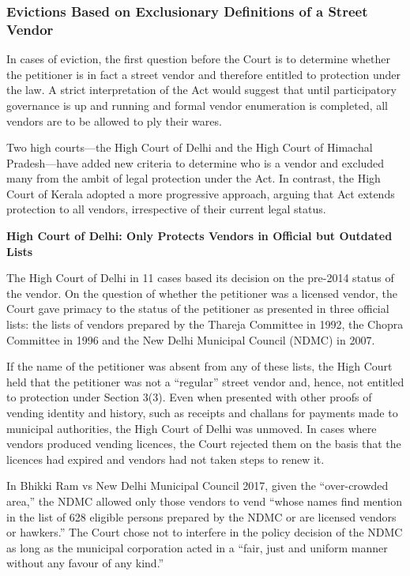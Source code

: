 \documentclass[a4paper, 12pt, twoside]{article}
\begin{document}
{\subsubsection*{Evictions Based on Exclusionary Definitions of a Street Vendor}

In cases of eviction, the first question before the Court is to determine whether the petitioner is in fact a street vendor and therefore entitled to protection under the law. A strict interpretation of the Act would suggest that until participatory governance is up and running and formal vendor enumeration is completed, all vendors are to be allowed to ply their wares.

Two high courts—the High Court of Delhi and the High Court of Himachal Pradesh—have added new criteria to determine who is a vendor and excluded many from the ambit of legal protection under the Act. In contrast, the High Court of Kerala adopted a more progressive approach, arguing that Act extends protection to all vendors, irrespective of their current legal status.

\textbf{High Court of Delhi: Only Protects Vendors in Official but Outdated Lists}

The High Court of Delhi in 11 cases  based its decision on the pre-2014 status of the vendor. On the question of whether the petitioner was a licensed vendor, the Court gave primacy to the status of the petitioner as presented in three official lists: the lists of vendors prepared by the Thareja Committee in 1992, the Chopra Committee in 1996 and the New Delhi Municipal Council (NDMC) in 2007.

If the name of the petitioner was absent from any of these lists, the High Court held that the petitioner was not a “regular” street vendor and, hence, not entitled to protection under Section 3(3). Even when presented with other proofs of vending identity and history, such as receipts  and challans for payments made to municipal authorities, the High Court of Delhi was unmoved. In cases where vendors produced vending licences, the Court rejected them on the basis that the licences had expired and vendors had not taken steps to renew it.

In Bhikki Ram vs New Delhi Municipal Council 2017, given the “over-crowded area,” the NDMC allowed only those vendors to vend “whose names find mention in the list of 628 eligible persons prepared by the NDMC or are licensed vendors or hawkers.” The Court chose not to interfere in the policy decision of the NDMC as long as the municipal corporation acted in a “fair, just and uniform manner without any favour of any kind.”

}
\end{document}
